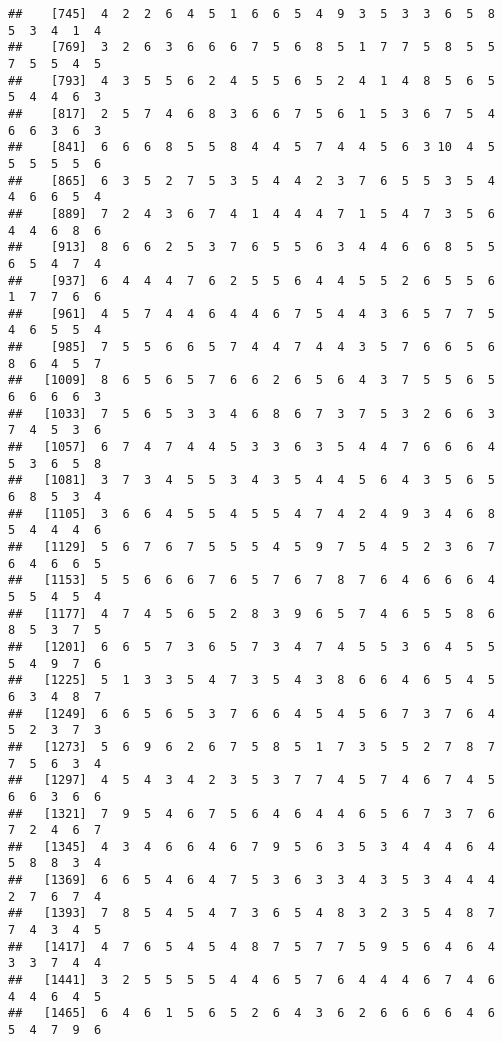 \documentclass[
]{book}
\begin{document}
\begin{verbatim}
##    [745]  4  2  2  6  4  5  1  6  6  5  4  9  3  5  3  3  6  5  8  5  3  4  1  4
##    [769]  3  2  6  3  6  6  6  7  5  6  8  5  1  7  7  5  8  5  5  7  5  5  4  5
##    [793]  4  3  5  5  6  2  4  5  5  6  5  2  4  1  4  8  5  6  5  5  4  4  6  3
##    [817]  2  5  7  4  6  8  3  6  6  7  5  6  1  5  3  6  7  5  4  6  6  3  6  3
##    [841]  6  6  6  8  5  5  8  4  4  5  7  4  4  5  6  3 10  4  5  5  5  5  5  6
##    [865]  6  3  5  2  7  5  3  5  4  4  2  3  7  6  5  5  3  5  4  4  6  6  5  4
##    [889]  7  2  4  3  6  7  4  1  4  4  4  7  1  5  4  7  3  5  6  4  4  6  8  6
##    [913]  8  6  6  2  5  3  7  6  5  5  6  3  4  4  6  6  8  5  5  6  5  4  7  4
##    [937]  6  4  4  4  7  6  2  5  5  6  4  4  5  5  2  6  5  5  6  1  7  7  6  6
##    [961]  4  5  7  4  4  6  4  4  6  7  5  4  4  3  6  5  7  7  5  4  6  5  5  4
##    [985]  7  5  5  6  6  5  7  4  4  7  4  4  3  5  7  6  6  5  6  8  6  4  5  7
##   [1009]  8  6  5  6  5  7  6  6  2  6  5  6  4  3  7  5  5  6  5  6  6  6  6  3
##   [1033]  7  5  6  5  3  3  4  6  8  6  7  3  7  5  3  2  6  6  3  7  4  5  3  6
##   [1057]  6  7  4  7  4  4  5  3  3  6  3  5  4  4  7  6  6  6  4  5  3  6  5  8
##   [1081]  3  7  3  4  5  5  3  4  3  5  4  4  5  6  4  3  5  6  5  6  8  5  3  4
##   [1105]  3  6  6  4  5  5  4  5  5  4  7  4  2  4  9  3  4  6  8  5  4  4  4  6
##   [1129]  5  6  7  6  7  5  5  5  4  5  9  7  5  4  5  2  3  6  7  6  4  6  6  5
##   [1153]  5  5  6  6  6  7  6  5  7  6  7  8  7  6  4  6  6  6  4  5  5  4  5  4
##   [1177]  4  7  4  5  6  5  2  8  3  9  6  5  7  4  6  5  5  8  6  8  5  3  7  5
##   [1201]  6  6  5  7  3  6  5  7  3  4  7  4  5  5  3  6  4  5  5  5  4  9  7  6
##   [1225]  5  1  3  3  5  4  7  3  5  4  3  8  6  6  4  6  5  4  5  6  3  4  8  7
##   [1249]  6  6  5  6  5  3  7  6  6  4  5  4  5  6  7  3  7  6  4  5  2  3  7  3
##   [1273]  5  6  9  6  2  6  7  5  8  5  1  7  3  5  5  2  7  8  7  7  5  6  3  4
##   [1297]  4  5  4  3  4  2  3  5  3  7  7  4  5  7  4  6  7  4  5  6  6  3  6  6
##   [1321]  7  9  5  4  6  7  5  6  4  6  4  4  6  5  6  7  3  7  6  7  2  4  6  7
##   [1345]  4  3  4  6  6  4  6  7  9  5  6  3  5  3  4  4  4  6  4  5  8  8  3  4
##   [1369]  6  6  5  4  6  4  7  5  3  6  3  3  4  3  5  3  4  4  4  2  7  6  7  4
##   [1393]  7  8  5  4  5  4  7  3  6  5  4  8  3  2  3  5  4  8  7  7  4  3  4  5
##   [1417]  4  7  6  5  4  5  4  8  7  5  7  7  5  9  5  6  4  6  4  3  3  7  4  4
##   [1441]  3  2  5  5  5  5  4  4  6  5  7  6  4  4  4  6  7  4  6  4  4  6  4  5
##   [1465]  6  4  6  1  5  6  5  2  6  4  3  6  2  6  6  6  6  4  6  5  4  7  9  6

\end{verbatim}
\end{document}
